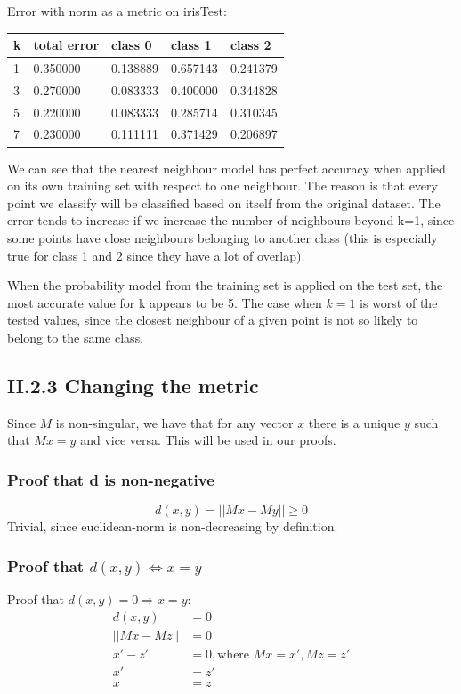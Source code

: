 \documentclass[a4paper,10pt]{article}
\begin{document}
Error with norm as a metric on irisTest:
\begin{center}
\begin{tabular}{l|llll}
 k & total error & class 0 & class 1 & class 2\\ \hline
 1 & 0.350000 & 0.138889 & 0.657143 & 0.241379\\
 3 & 0.270000 & 0.083333 & 0.400000 & 0.344828\\
 5 & 0.220000 & 0.083333 & 0.285714 & 0.310345\\
 7 & 0.230000 & 0.111111 & 0.371429 & 0.206897\\
\end{tabular}
\end{center}

We can see that the nearest neighbour model has perfect accuracy when
applied on its own training set with respect to one neighbour. The reason
is that every point we classify will be classified based on itself from
the original dataset. The error tends to increase if we increase the number of
neighbours beyond k=1, since some points have close neighbours belonging to another class (this is especially true for class 1 and 2 since they have a lot of overlap).

When the probability model from the training set is applied on the test set,
the most accurate value for k appears to be 5. The case when $k=1$ is worst
of the tested values, since the closest neighbour of a given point is not
so likely to belong to the same class.

\subsection*{II.2.3 Changing the metric}

Since $M$ is non-singular, we have that for any vector $x$ there is a unique $y$ such that $Mx=y$ and vice versa. This will be used in our proofs.\\

\subsubsection*{Proof that d is non-negative}
\[
d(x,y)=||Mx-My||\geq0
\]
Trivial, since euclidean-norm is non-decreasing by definition.\\

\subsubsection*{Proof that $d(x,y) \iff x=y$}
Proof that $d(x,y)=0 \Rightarrow x=y$:
\begin{align*}
d(x,y)&=0\\
||Mx-Mz||&=0\\
x'-z'&=0, \text{where }Mx=x', Mz=z'\\
x'&=z'\\
x&=z
\end{align*}
\end{document}

